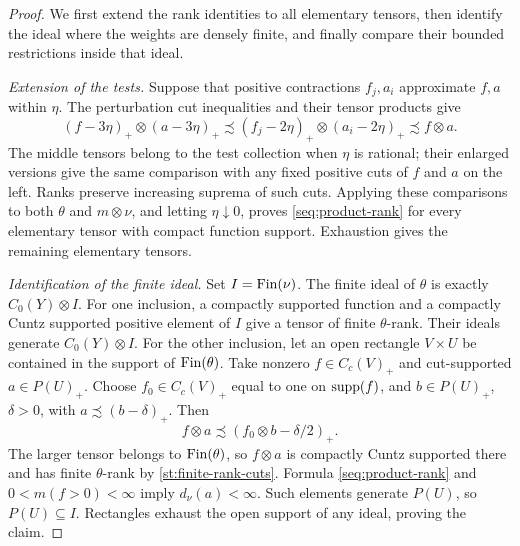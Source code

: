 \begin{proof}
We first extend the rank identities to all elementary tensors, then
identify the ideal where the weights are densely finite, and finally
compare their bounded restrictions inside that ideal.

\emph{Extension of the tests.}
Suppose that positive contractions \(f_j,a_i\) approximate
\(f,a\) within \(\eta\). The perturbation cut inequalities and
their tensor products give
\[
 (f-3\eta)_+\otimes(a-3\eta)_+
 \precsim(f_j-2\eta)_+\otimes(a_i-2\eta)_+
 \precsim f\otimes a.
\]
The middle tensors belong to the test collection when \(\eta\) is
rational; their enlarged versions give the same comparison with any
fixed positive cuts of \(f\) and \(a\) on the left.
Ranks preserve increasing suprema of such cuts. Applying these
comparisons to both \(\theta\) and \(m\otimes\nu\), and letting
\(\eta\downarrow0\), proves \eqref{seq:product-rank} for every
elementary tensor with compact function support. Exhaustion gives
the remaining elementary tensors.

\emph{Identification of the finite ideal.}
Set \(I=\operatorname{Fin}(\nu)\). The finite ideal of \(\theta\) is exactly
\(C_0(Y)\otimes I\). For one inclusion, a compactly supported
function and a compactly Cuntz supported positive element of \(I\)
give a tensor of finite \(\theta\)-rank. Their ideals generate
\(C_0(Y)\otimes I\).
For the other inclusion, let an open rectangle \(V\times U\) be
contained in the support of \(\operatorname{Fin}(\theta)\). Take nonzero
\(f\in C_c(V)_+\) and cut-supported \(a\in P(U)_+\).
Choose \(f_0\in C_c(V)_+\) equal to one on \(\operatorname{supp}(f)\), and
\(b\in P(U)_+\), \(\delta>0\), with
\(a\precsim(b-\delta)_+\). Then
\[
 f\otimes a\precsim(f_0\otimes b-\delta/2)_+.
\]
The larger tensor belongs to \(\operatorname{Fin}(\theta)\), so \(f\otimes a\)
is compactly Cuntz supported there and has finite \(\theta\)-rank by
\eqref{st:finite-rank-cuts}. Formula \eqref{seq:product-rank} and
\(0<m(f>0)<\infty\) imply \(d_\nu(a)<\infty\).
Such elements generate \(P(U)\), so \(P(U)\subseteq I\).
Rectangles exhaust the open support of any ideal, proving the claim.


\end{proof}
